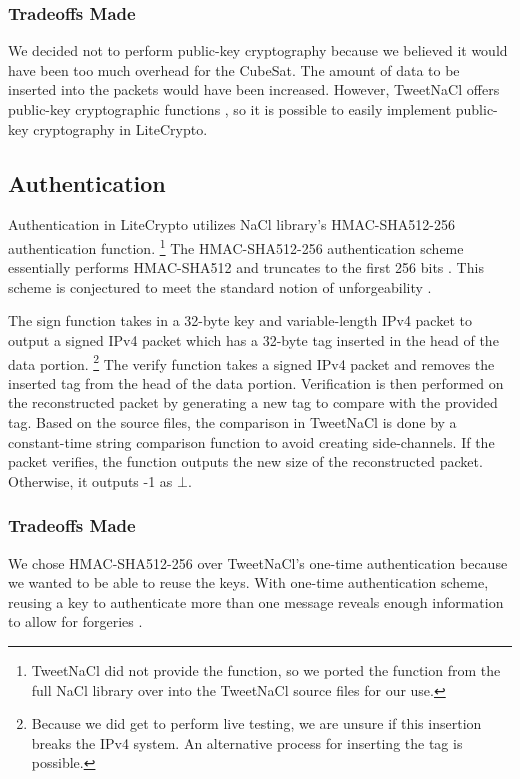 \documentclass[12pt]{article}
\begin{document}
\begin{multicols}{2}
\subsubsection{Tradeoffs Made}

We decided not to perform public-key cryptography because we believed it would have been too much overhead for the CubeSat. The amount of data to be inserted into the packets would have been increased. However, TweetNaCl offers public-key cryptographic functions \cite{TweetNaClPaper}, so it is possible to easily implement public-key cryptography in LiteCrypto.

\subsection{Authentication}

Authentication in LiteCrypto utilizes NaCl library's HMAC-SHA512-256 authentication function. \footnote{TweetNaCl did not provide the function, so we ported the function from the full NaCl library over into the TweetNaCl source files for our use.} The HMAC-SHA512-256 authentication scheme essentially performs HMAC-SHA512 and truncates to the first 256 bits \cite{NaClSiteAuth}. This scheme is conjectured to meet the standard notion of unforgeability \cite{NaClSiteAuth}.

The sign function takes in a 32-byte key \cite{NaClSiteAuth} and variable-length IPv4 packet to output a signed IPv4 packet which has a 32-byte tag \cite{NaClSiteAuth} inserted in the head of the data portion. \footnote{Because we did get to perform live testing, we are unsure if this insertion breaks the IPv4 system. An alternative process for inserting the tag is possible.} The verify function takes a signed IPv4 packet and removes the inserted tag from the head of the data portion. Verification is then performed on the reconstructed packet by generating a new tag to compare with the provided tag. Based on the source files, the comparison in TweetNaCl is done by a constant-time string comparison function to avoid creating side-channels. If the packet verifies, the function outputs the new size of the reconstructed packet. Otherwise, it outputs -1 as $\bot$.

\subsubsection{Tradeoffs Made}

We chose HMAC-SHA512-256 over TweetNaCl's one-time authentication because we wanted to be able to reuse the keys. With one-time authentication scheme, reusing a key to authenticate more than one message reveals enough information to allow for forgeries \cite{NaClSiteOneTimeAuth}.


\end{multicols}
\end{document}
